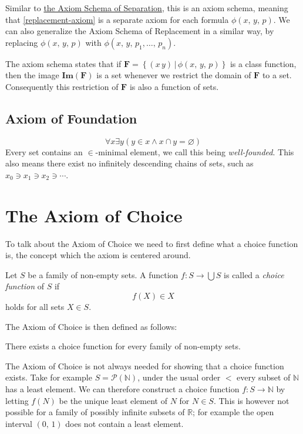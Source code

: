 \documentclass[../../main.tex]{subfiles}
\begin{document}
Similar to \hyperref[ZF3]{the Axiom Schema of Separation}, this is an axiom schema, meaning that \eqref{replacement-axiom} is a separate axiom for each formula $\phi(x,\, y,\, p)$.
We can also generalize the Axiom Schema of Replacement in a similar way, by replacing $\phi(x,\, y,\, p)$ with $\phi(x,\, y,\, p_1,\ldots,\, p_n)$.

The axiom schema states that if $\mathbf{F} = \left\{(x\, y) \,\vert\, \phi(x,\, y,\, p)\right\}$ is a class function,
then the image $\mathbf{Im}(\mathbf{F})$ is a set whenever we restrict the domain of $\mathbf{F}$ to a set.
Consequently this restriction of $\mathbf{F}$ is also a function of sets. \cite[p.11]{Jec78}

\subsection{Axiom of Foundation}\label{ZF9}
$$\forall x \exists y \left(y \in x \wedge x \cap y = \varnothing \right)$$
Every set contains an $\in$-minimal element, we call this being \textit{well-founded}.\cite[p.92]{Gol17}
This also means there exist no infinitely descending chains of sets, such as $x_0 \ni x_1 \ni x_2 \ni \cdots$.\cite[Theorem 4.3, p.95]{Gol17}

\section{The Axiom of Choice}
To talk about the Axiom of Choice we need to first define what a choice function is, the concept which the axiom is centered around.
\begin{definition}\cite[p.38]{Jec78}
    Let $S$ be a family of non-empty sets.
    A function $f: S \to \bigcup S$ is called a \textit{choice function} of $S$ if
    $$f(X) \in X$$
    holds for all sets $X \in S$.
\end{definition}
The Axiom of Choice is then defined as follows:
\begin{definition}\cite[p.38]{Jec78}\label{choice-axiom}
    There exists a choice function for every family of non-empty sets.
\end{definition}

The Axiom of Choice is not always needed for showing that a choice function exists.
Take for example $S = \mathcal{P}(\mathbb{N})$, under the usual order $<$ every subset of $\mathbb{N}$ has a least element.
We can therefore construct a choice function $f: S \to \mathbb{N}$ by letting $f(N)$ be the unique least element of $N$ for $N \in S$.
This is however not possible for a family of possibly infinite subsets of $\mathbb{R}$; for example the open interval $\left(0,\, 1\right)$ does not contain a least element.
\end{document}
